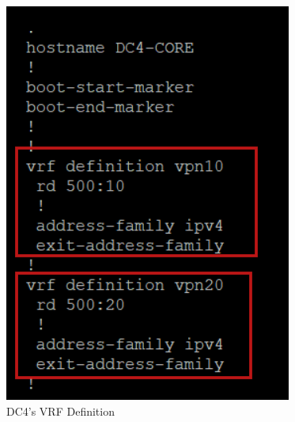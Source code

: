 \documentclass[12pt,english]{report}
\begin{document}
\begin{figure}[H]
    \begin{minipage}[b]{0.48\textwidth} %
        \centering
        \includegraphics[width=\textwidth]{chapitre 3/15.png}
        \caption{DC4's VRF Definition}
        \label{fig:DC4's VRF Definition}
    \end{minipage}
    \hfill %
    \begin{minipage}[b]{0.48\textwidth} %
        \centering

\end{minipage}
\end{figure}
\end{document}
